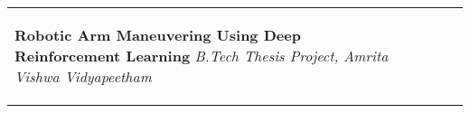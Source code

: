 \documentclass[10pt,a4]{article}
\begin{document}
{\begin{tabu}
\begin{center}
\begin{tabular} {p{} p{} p{} p{}}
\begin{flushleft}
        \item \hspace{1.5mm} \textbf{\large Robotic Arm Maneuvering Using Deep Reinforcement Learning}
        \hfill \textit{B.Tech Thesis Project, Amrita Vishwa Vidyapeetham}

        \vspace{0.25mm}
            
        


\end{flushleft}
\end{tabular}
\end{center}
\end{tabu}}
\end{document}
